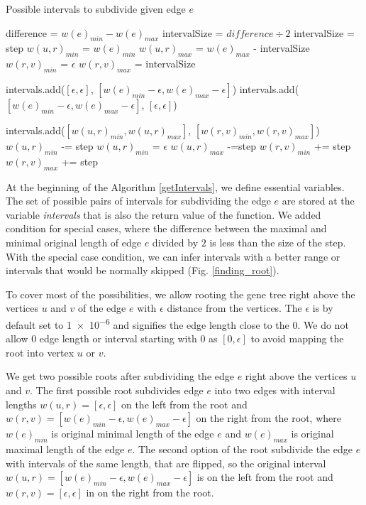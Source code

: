 \begin{algorithm}
\caption{Possible intervals to subdivide given edge $e$} 
\label{getIntervals}
\begin{algorithmic}[1]
	\State difference = $w(e)_{min} - w(e)_{max}$
		\State intervalSize = $difference \div 2$
	\Else
		\State intervalSize = step
	\EndIf
	\State $w(u,r)_{min}$ = $w(e)_{min}$
	\State $w(u,r)_{max}$ = $w(e)_{max}$ - intervalSize
	\State $w(r,v)_{min}$ = $\epsilon$
	\State $w(r,v)_{max}$ = intervalSize
	
	\State intervals.add($[ \epsilon, \epsilon ]$, $[ w(e)_{min}-\epsilon, w(e)_{max}-\epsilon ]$) 
	\State intervals.add($[ w(e)_{min}-\epsilon, w(e)_{max}-\epsilon ]$, $[ \epsilon, \epsilon ]$)
	
		\State intervals.add($[w(u,r)_{min}, w(u,r)_{max}]$, $[w(r,v)_{min},w(r,v)_{max}]$)
		\State $w(u,r)_{min}$ -= step
			\State $w(u,r)_{min}$ = $\epsilon$
		\EndIf
		\State $w(u,r)_{max}$ -=step
		\State $w(r,v)_{min}$ += step
		\State $w(r,v)_{max}$ += step
	\EndWhile
	\EndIf
\EndFunction
\end{algorithmic}
\end{algorithm}

At the beginning of the Algorithm \ref{getIntervals}, we define essential variables. The set of possible pairs of intervals for subdividing the edge $e$ are stored at the variable \emph{intervals} that is also the return value of the function. We added condition for special cases, where the difference between the maximal and minimal original length of edge $e$ divided by $2$ is less than the size of the step. With the special case condition, we can infer intervals with a better range or intervals that would be normally skipped (Fig. \ref{finding_root}).

To cover most of the possibilities, we allow rooting the gene tree right above the vertices $u$ and $v$ of the edge $e$ with $\epsilon$ distance from the vertices. The $\epsilon$ is by default set to \num{1e-6} and signifies the edge length close to the $0$. We do not allow $0$ edge length or interval starting with $0$ as $[0, \epsilon]$ to avoid mapping the root into vertex $u$ or $v$.

We get two possible roots after subdividing the edge $e$ right above the vertices $u$ and $v$. The first possible root subdivides edge $e$ into two edges with interval lengths $w(u, r) = [ \epsilon, \epsilon ]$ on the left from the root and $w(r, v) = [ w(e)_{min}-\epsilon, w(e)_{max}-\epsilon ]$ on the right from the root, where $w(e)_{min}$ is original minimal length of the edge $e$ and $w(e)_{max}$ is original maximal length of the edge $e$. The second option of the root subdivide the edge $e$ with intervals of the same length, that are flipped, so the original interval $w(u, r) = [ w(e)_{min}-\epsilon, w(e)_{max}-\epsilon ]$ is on the left from the root and $w(r, v) = [ \epsilon, \epsilon ]$ in on the right from the root.


